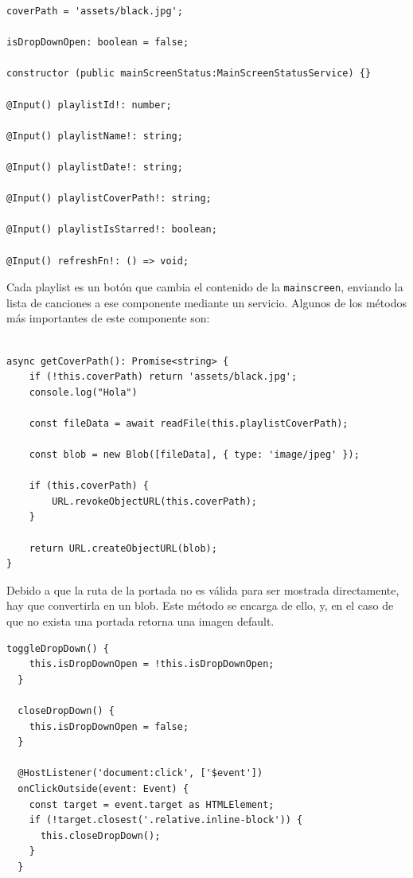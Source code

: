 \documentclass[11pt, a4paper]{article}
\begin{document}
                \begin{lstlisting}[caption={Atributos y Constructora}]
coverPath = 'assets/black.jpg';

isDropDownOpen: boolean = false;

constructor (public mainScreenStatus:MainScreenStatusService) {}

@Input() playlistId!: number;

@Input() playlistName!: string;

@Input() playlistDate!: string;

@Input() playlistCoverPath!: string;

@Input() playlistIsStarred!: boolean;

@Input() refreshFn!: () => void;
                \end{lstlisting}

                Cada playlist es un botón que cambia el contenido de la \verb|mainscreen|, enviando la lista de canciones a ese componente mediante un servicio. Algunos de los métodos más importantes de este componente son:

                \begin{lstlisting}[caption={getCoverPath()}]

async getCoverPath(): Promise<string> {
    if (!this.coverPath) return 'assets/black.jpg';
    console.log("Hola")

    const fileData = await readFile(this.playlistCoverPath);
        
    const blob = new Blob([fileData], { type: 'image/jpeg' });

    if (this.coverPath) {
        URL.revokeObjectURL(this.coverPath);
    }

    return URL.createObjectURL(blob);
}
                \end{lstlisting}

                Debido a que la ruta de la portada no es válida para ser mostrada directamente, hay que convertirla en un blob. Este método se encarga de ello, y, en el caso de que no exista una portada retorna una imagen default.

                \begin{lstlisting}[caption={Dropdown}]
toggleDropDown() {
    this.isDropDownOpen = !this.isDropDownOpen;
  }

  closeDropDown() {
    this.isDropDownOpen = false;
  }

  @HostListener('document:click', ['$event'])
  onClickOutside(event: Event) {
    const target = event.target as HTMLElement;
    if (!target.closest('.relative.inline-block')) {
      this.closeDropDown();
    }
  }
                \end{lstlisting}
\end{document}
